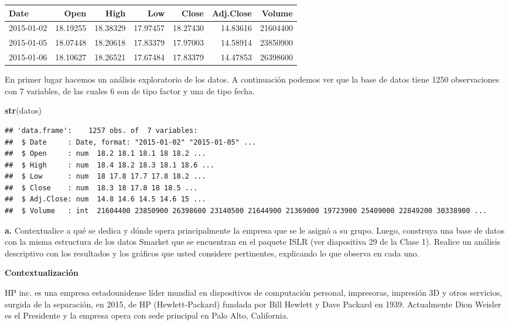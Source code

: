 \documentclass[
]{article}
\newenvironment{Shaded}{\begin{snugshade}}{\end{snugshade}}
\newcommand{\KeywordTok}[1]{\textcolor[rgb]{0.13,0.29,0.53}{\textbf{#1}}}
\newcommand{\NormalTok}[1]{#1}
\begin{document}
\begin{table}[H]
\centering
\begin{tabular}[t]{l|r|r|r|r|r|r}
\hline
Date & Open & High & Low & Close & Adj.Close & Volume\\
\hline
2015-01-02 & 18.19255 & 18.38329 & 17.97457 & 18.27430 & 14.83616 & 21604400\\
\hline
2015-01-05 & 18.07448 & 18.20618 & 17.83379 & 17.97003 & 14.58914 & 23850900\\
\hline
2015-01-06 & 18.10627 & 18.26521 & 17.67484 & 17.83379 & 14.47853 & 26398600\\
\hline
\end{tabular}
\end{table}

En primer lugar hacemos un análisis exploratorio de los datos. A
continuación podemos ver que la base de datos tiene 1250 observaciones
con 7 variables, de las cuales 6 son de tipo factor y una de tipo fecha.

\begin{Shaded}
\begin{Highlighting}[]
\KeywordTok{str}\NormalTok{(datos)}
\end{Highlighting}
\end{Shaded}

\begin{verbatim}
## 'data.frame':    1257 obs. of  7 variables:
##  $ Date     : Date, format: "2015-01-02" "2015-01-05" ...
##  $ Open     : num  18.2 18.1 18.1 18 18.2 ...
##  $ High     : num  18.4 18.2 18.3 18.1 18.6 ...
##  $ Low      : num  18 17.8 17.7 17.8 18.2 ...
##  $ Close    : num  18.3 18 17.8 18 18.5 ...
##  $ Adj.Close: num  14.8 14.6 14.5 14.6 15 ...
##  $ Volume   : int  21604400 23850900 26398600 23140500 21644900 21369000 19723900 25409000 22849200 30338900 ...
\end{verbatim}

\textbf{a.} Contextualice a qué se dedica y dónde opera principalmente
la empresa que se le asignó a su grupo. Luego, construya una base de
datos con la misma estructura de los datos Smarket que se encuentran en
el paquete ISLR (ver diapositiva 29 de la Clase 1). Realice un análisis
descriptivo con los resultados y los gráficos que usted considere
pertinentes, explicando lo que observa en cada uno.

\textbf{Contextualización}

HP inc. es una empresa estadounidense líder mundial en dispositivos de
computación personal, impresoras, impresión 3D y otros servicios,
surgida de la separación, en 2015, de HP (Hewlett-Packard) fundada por
Bill Hewlett y Dave Packard en 1939. Actualmente Dion Weisler es el
Presidente y la empresa opera con sede principal en Palo Alto,
California.
\end{document}
